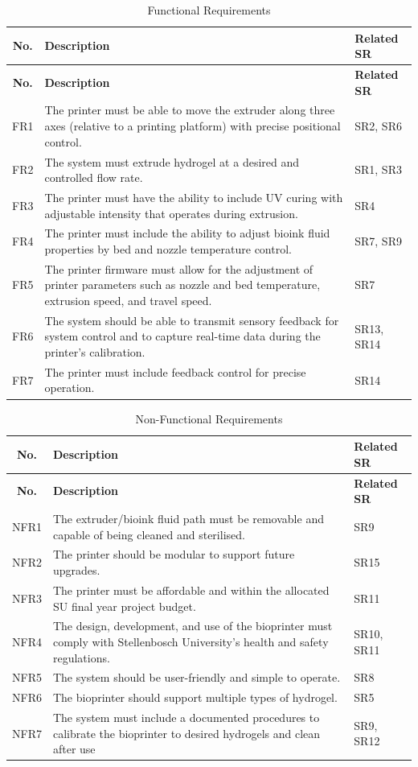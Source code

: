 \small
\begin{longtable}{|c|m{8.1cm}|l|}
\caption{Functional Requirements} 
\label{tab:func_requirements} \\
\hline
\textbf{No.} & \textbf{Description} & \textbf{Related SR} \\
\hline
\endfirsthead
\hline
\textbf{No.} & \textbf{Description} & \textbf{Related SR} \\
\hline
\endhead
FR1 & The printer must be able to move the extruder along three axes (relative to a printing platform) with precise positional control. & SR2, SR6 \\
\hline
FR2 & The system must extrude hydrogel at a desired and controlled flow rate. & SR1, SR3 \\
\hline
FR3 & The printer must have the ability to include UV curing with adjustable intensity that operates during extrusion. & SR4 \\
\hline
FR4 & The printer must include the ability to adjust bioink fluid properties by bed and nozzle temperature control. & SR7, SR9 \\
\hline
FR5 & The printer firmware must allow for the adjustment of printer parameters such as nozzle and bed temperature, extrusion speed, and travel speed. & SR7 \\
\hline
FR6 & The system should be able to transmit sensory feedback for system control and to capture real-time data during the printer's calibration. & SR13, SR14 \\
\hline
FR7 & The printer must include feedback control for precise operation. & SR14 \\
\hline
\end{longtable}

\small
\begin{longtable}{|c|m{8.1cm}|l|}
\caption{Non-Functional Requirements}
\label{tab:nonfunc_requirements} \\
\hline
\textbf{No.} & \textbf{Description} & \textbf{Related SR} \\
\endfirsthead
\hline
\hline
\textbf{No.} & \textbf{Description} & \textbf{Related SR} \\
\hline
\endhead
\hline
NFR1 & The extruder/bioink fluid path must be removable and capable of being cleaned and sterilised. & SR9 \\
\hline
NFR2 & The printer should be modular to support future upgrades. & SR15 \\
\hline
NFR3 & The printer must be affordable and within the allocated SU final year project budget. & SR11 \\
\hline
NFR4 & The design, development, and use of the bioprinter must comply with Stellenbosch University's health and safety regulations. & SR10, SR11 \\
\hline
NFR5 & The system should be user-friendly and simple to operate. & SR8 \\
\hline
NFR6 & The bioprinter should support multiple types of hydrogel. & SR5 \\
\hline
NFR7 & The system must include a documented procedures to calibrate the bioprinter to desired hydrogels and clean after use & SR9, SR12 \\
\hline
\end{longtable}


